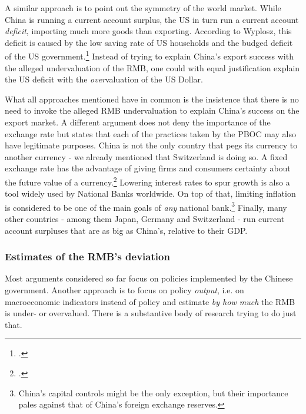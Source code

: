 A similar approach is to point out the symmetry of the world market. 
While China is running a current account surplus, the US in turn run a 
current account \emph{deficit}, importing much more goods than 
exporting. According to Wyplosz, this deficit is caused by the low 
saving rate of US households and the budged deficit of the US 
government.\footnote{\cite[pp. 39-40]{Wyplosz2010}.} Instead of trying 
to explain China's export success with the alleged undervaluation of the 
RMB, one could with equal justification explain the US deficit with the 
\emph{over}valuation of the US Dollar. 

What all approaches mentioned have in common is the insistence that 
there is no need to invoke the alleged RMB undervaluation to explain 
China's success on the export market. A different argument does not deny 
the importance of the exchange rate but states that each of the 
practices taken by the PBOC may also have legitimate purposes. China is 
not the only country that pegs its currency to another currency - we 
already mentioned that Switzerland is doing so. A fixed exchange rate 
has the advantage of giving firms and consumers certainty about the 
future value of a currency.\footnote{\cite[p. 515]{Krugman2008}.} 
Lowering interest rates to spur growth is also a tool widely used by 
National Banks worldwide. On top of that, limiting inflation is 
considered to be one of the main goals of \emph{any} national 
bank.\footnote{China's capital controls might be the only exception, but 
	their importance pales against that of China's foreign exchange 
reserves.} Finally, many other countries - among them Japan, Germany and 
Switzerland - run current account surpluses that are as big as China's, 
relative to their GDP.




\subsubsection{Estimates of the RMB's deviation}

Most arguments considered so far focus on policies implemented by the 
Chinese government. Another approach is to focus on policy 
\emph{output}, i.e. on macroeconomic indicators instead of policy and 
estimate \emph{by how much} the RMB is under- or overvalued. There is a 
substantive body of research trying to do just that.

